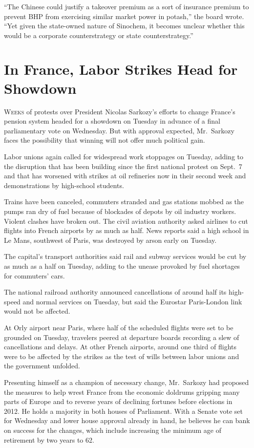 ﻿\documentclass[12pt]{article}
\begin{document}
``The Chinese could justify a takeover premium as a sort of insurance premium to prevent BHP from
exercising similar market power in potash,'' the board wrote. ``Yet given the state-owned nature of
Sinochem, it becomes unclear whether this would be a corporate counterstrategy or state
counterstrategy.''

\section{In France, Labor Strikes Head for Showdown}

\lettrine{W}{eeks} of protests over President Nicolas Sarkozy's efforts to
change France's pension system headed for a showdown on Tuesday in advance of a final parliamentary
vote on Wednesday. But with approval expected, Mr.~Sarkozy faces the possibility that winning will
not offer much political gain.

Labor unions again called for widespread work stoppages on Tuesday, adding to the disruption that
has been building since the first national protest on Sept.~7 and that has worsened with strikes at
oil refineries now in their second week and demonstrations by high-school students.

Trains have been canceled, commuters stranded and gas stations mobbed as the pumps ran dry of fuel
because of blockades of depots by oil industry workers. Violent clashes have broken out. The civil
aviation authority asked airlines to cut flights into French airports by as much as half. News
reports said a high school in Le Mans, southwest of Paris, was destroyed by arson early on Tuesday.

The capital's transport authorities said rail and subway services would be cut by as much as a half
on Tuesday, adding to the unease provoked by fuel shortages for commuters' cars.

The national railroad authority announced cancellations of around half its high-speed and normal
services on Tuesday, but said the Eurostar Paris-London link would not be affected.

At Orly airport near Paris, where half of the scheduled flights were set to be grounded on Tuesday,
travelers peered at departure boards recording a slew of cancellations and delays. At other French
airports, around one third of flights were to be affected by the strikes as the test of wills
between labor unions and the government unfolded.

Presenting himself as a champion of necessary change, Mr.~Sarkozy had proposed the measures to help
wrest France from the economic doldrums gripping many parts of Europe and to reverse years of
declining fortunes before elections in 2012. He holds a majority in both houses of Parliament. With
a Senate vote set for Wednesday and lower house approval already in hand, he believes he can bank on
success for the changes, which include increasing the minimum age of retirement by two years to 62.
\end{document}

